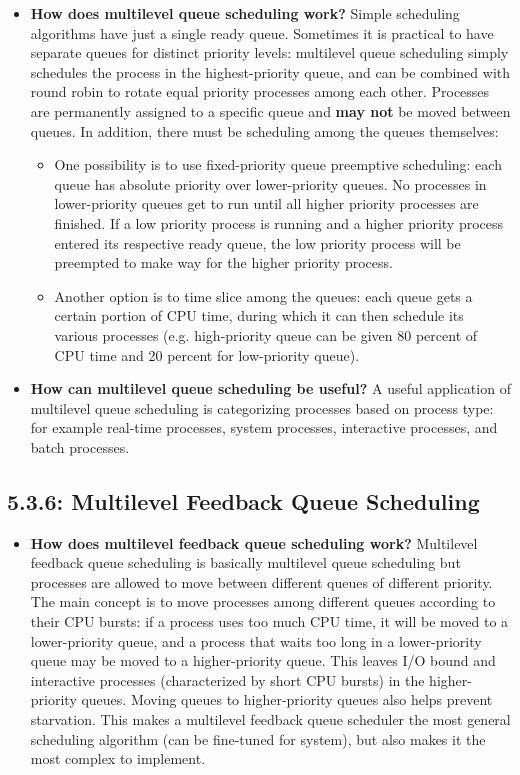 \documentclass[12pt]{article}
\begin{document}
\begin{itemize}
    \item \textbf{How does multilevel queue scheduling work?} Simple scheduling algorithms have just a single ready queue. Sometimes it is practical to have separate queues for distinct priority levels: multilevel queue scheduling simply schedules the process in the highest-priority queue, and can be combined with round robin to rotate equal priority processes among each other. Processes are permanently assigned to a specific queue and \textbf{may not} be moved between queues. In addition, there must be scheduling among the queues themselves:
        \begin{itemize}
            \item One possibility is to use fixed-priority queue preemptive scheduling: each queue has absolute priority over lower-priority queues. No processes in lower-priority queues get to run until all higher priority processes are finished. If a low priority process is running and a higher priority process entered its respective ready queue, the low priority process will be preempted to make way for the higher priority process.
            \item Another option is to time slice among the queues: each queue gets a certain portion of CPU time, during which it can then schedule its various processes (e.g. high-priority queue can be given 80 percent of CPU time and 20 percent for low-priority queue).
        \end{itemize}
    \item \textbf{How can multilevel queue scheduling be useful?} A useful application of multilevel queue scheduling is categorizing processes based on process type: for example real-time processes, system processes, interactive processes, and batch processes.
\end{itemize}

\subsection*{5.3.6: Multilevel Feedback Queue Scheduling}

\begin{itemize}
    \item \textbf{How does multilevel feedback queue scheduling work?} Multilevel feedback queue scheduling is basically multilevel queue scheduling but processes are allowed to move between different queues of different priority. The main concept is to move processes among different queues according to their CPU bursts: if a process uses too much CPU time, it will be moved to a lower-priority queue, and a process that waits too long in a lower-priority queue may be moved to a higher-priority queue. This leaves I/O bound and interactive processes (characterized by short CPU bursts) in the higher-priority queues. Moving queues to higher-priority queues also helps prevent starvation. This makes a multilevel feedback queue scheduler the most general scheduling algorithm (can be fine-tuned for system), but also makes it the most complex to implement.
\end{itemize}
\end{document}
